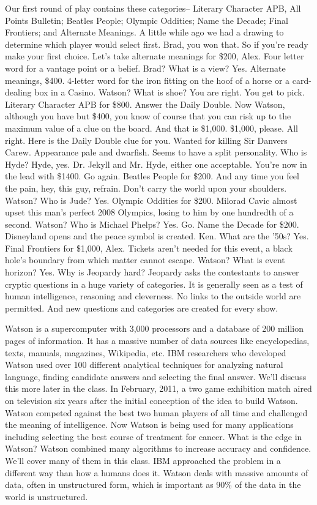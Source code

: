 Our first round of play contains these categories--
Literary Character APB, All Points Bulletin; Beatles
People; Olympic Oddities; Name the Decade;
Final Frontiers; and Alternate Meanings.
A little while ago we had a drawing
to determine which player would select first.
Brad, you won that.
So if you're ready make your first choice.
Let's take alternate meanings for \$200, Alex.
Four letter word for a vantage point or a belief.
Brad?
What is a view?
Yes.
Alternate meanings, \$400.
4-letter word for the iron fitting
on the hoof of a horse or a card-dealing box in a Casino.
Watson?
What is shoe?
You are right.
You get to pick.
Literary Character APB for \$800.
Answer the Daily Double.
Now Watson, although you have but \$400,
you know of course that you can risk up
to the maximum value of a clue on the board.
And that is \$1,000.
\$1,000, please.
All right.
Here is the Daily Double clue for you.
Wanted for killing Sir Danvers Carew.
Appearance pale and dwarfish.
Seems to have a split personality.
Who is Hyde?
Hyde, yes.
Dr. Jekyll and Mr. Hyde, either one acceptable.
You're now in the lead with \$1400.
Go again.
Beatles People for \$200.
And any time you feel the pain, hey, this guy, refrain.
Don't carry the world upon your shoulders.
Watson?
Who is Jude?
Yes.
Olympic Oddities for \$200.
Milorad Cavic almost upset this man's perfect 2008 Olympics,
losing to him by one hundredth of a second.
Watson?
Who is Michael Phelps?
Yes.
Go.
Name the Decade for \$200.
Disneyland opens and the peace symbol is created.
Ken.
What are the '50s?
Yes.
Final Frontiers for \$1,000, Alex.
Tickets aren't needed for this event,
a black hole's boundary from which matter cannot escape.
Watson?
What is event horizon?
Yes.
Why is Jeopardy hard?
Jeopardy asks the contestants to answer cryptic questions
in a huge variety of categories.
It is generally seen as a test of human intelligence,
reasoning and cleverness.
No links to the outside world are permitted.
And new questions and categories are created for every show.

Watson is a supercomputer with 3,000 processors
and a database of 200 million pages of information.
It has a massive number of data sources like encyclopedias,
texts, manuals, magazines, Wikipedia, etc.
IBM researchers who developed Watson
used over 100 different analytical techniques
for analyzing natural language, finding candidate answers
and selecting the final answer.
We'll discuss this more later in the class.
In February, 2011, a two game exhibition match
aired on television six years after the initial conception
of the idea to build Watson.
Watson competed against the best two human players of all time
and challenged the meaning of intelligence.
Now Watson is being used for many applications including
selecting the best course of treatment for cancer.
What is the edge in Watson?
Watson combined many algorithms to increase
accuracy and confidence.
We'll cover many of them in this class.
IBM approached the problem in a different way
than how a humans does it.
Watson deals with massive amounts of data,
often in unstructured form, which is important
as 90\% of the data in the world is unstructured.